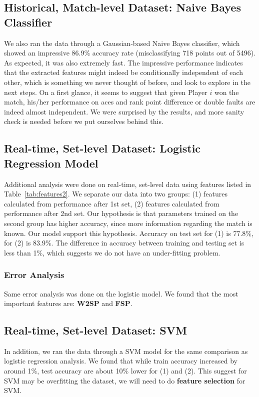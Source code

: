 \documentclass[paper=a4, fontsize=10pt]{scrartcl} %
\numberwithin{equation}{section} %
\numberwithin{figure}{section} %
\numberwithin{table}{section} %
\begin{document}
\subsection{Historical, Match-level Dataset: Naive Bayes Classifier}
We also ran the data through a Gaussian-based Naive Bayes classifier, which showed an impressive 86.9\% accuracy rate (misclassifying 718 points out of 5496). As expected, it was also extremely fast. The impressive performance indicates that the extracted features might indeed be conditionally independent of each other, which is something we never thought of before, and look to explore in the next steps. On a first glance, it seems to suggest that given Player $i$ won the match, his/her performance on aces and rank point difference or double faults are indeed almost independent. We were surprised by the results, and more sanity check is needed before we put ourselves behind this. 
\subsection{Real-time, Set-level Dataset: Logistic Regression Model}
Additional analysis were done on real-time, set-level data using features listed in Table~\ref{tab:features2}. We separate our data into two groups: (1) features calculated from performance after 1st set, (2) features calculated from performance after 2nd set.  Our hypothesis is that parameters trained on the second group has higher accuracy, since more information regarding the match is known.  Our model support this hypothesis.  Accuracy on test set for (1) is 77.8\%, for (2) is 83.9\%.  The difference in accuracy between training and testing set is less than 1\%, which suggests we do not have an under-fitting problem.
\subsubsection{Error Analysis}
Same error analysis was done on the logistic model.  We found that the most important features are: \textbf{W2SP} and \textbf{FSP}.
\subsection{Real-time, Set-level Dataset:  SVM}
In addition, we ran the data through a SVM model for the same comparison as logistic regression analysis.  We found that while train accuracy increased by around 1\%, test accuracy are about 10\%  lower for (1) and (2).  This suggest for SVM may be overfitting the dataset, we will need to do \textbf{feature selection} for SVM.
\end{document}
